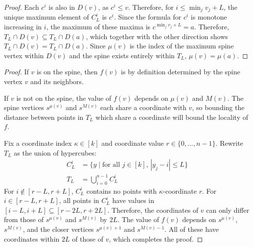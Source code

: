 \documentclass[11pt]{article}
\begin{document}
\begin{proof}
    Each $c^i$ is also in $D(v)$, as $c^i \leq v$. Therefore, for $i \leq \min_j v_j + L$, the unique maximum element of $C_L^i$ is $c^i$. Since the formula for $c^i$ is monotone increasing in $i$, the maximum of these maxima is $c^{\min_j v_j + L} = a$. Therefore, $T_L \cap D(v) \subseteq T_L \cap D(a)$, which together with the other direction shows $T_L \cap D(v) = T_L \cap D(a)$. Since $\mu(v)$ is the index of the maximum spine vertex within $D(v)$ and the spine exists entirely within $T_L$, $\mu(v) = \mu(a)$.

\end{proof}


\lemmatubequerylocality*
\begin{proof}
    If $v$ is on the spine, then $f(v)$ is by definition determined by the spine vertex $v$ and its neighbors.

    If $v$ is not on the spine, the value of $f(v)$ depends on $\mu(v)$ and $M(v)$. The spine vertices $s^{\mu(v)}$ and $s^{M(v)}$ each share a coordinate with $v$, so bounding the distance between points in $T_L$ which share a coordinate will bound the locality of $f$.

    Fix a coordinate index $\kappa \in [k]$ and coordinate value $r \in \{0, \ldots, n-1\}$. Rewrite $T_L$ as the union of hypercubes:
    \begin{align}
        C_L^i &= \{ y \mid \text{for all $j \in [k]$, $|y_j - i| \leq L$}\} \\
        T_L &= \bigcup_{i=0}^{n-1} C_L^i
    \end{align}
    For $i \not \in [r - L, r + L]$, $C_L^i$ contains no points with $\kappa$-coordinate $r$. For $i \in [r - L, r + L]$, all points in $C_L^i$ have values in $[i - L, i + L] \subseteq [r - 2L, r + 2L]$. Therefore, the coordinates of $v$ can only differ from those of $s^{\mu(v)}$ and $s^{M(v)}$ by $2L$. The value of $f(v)$ depends on $s^{\mu(v)}$, $s^{M(v)}$, and the closer vertices $s^{\mu(v) + 1}$ and $s^{M(v) - 1}$. All of these have coordinates within $2L$ of those of $v$, which completes the proof.
\end{proof}
\end{document}
